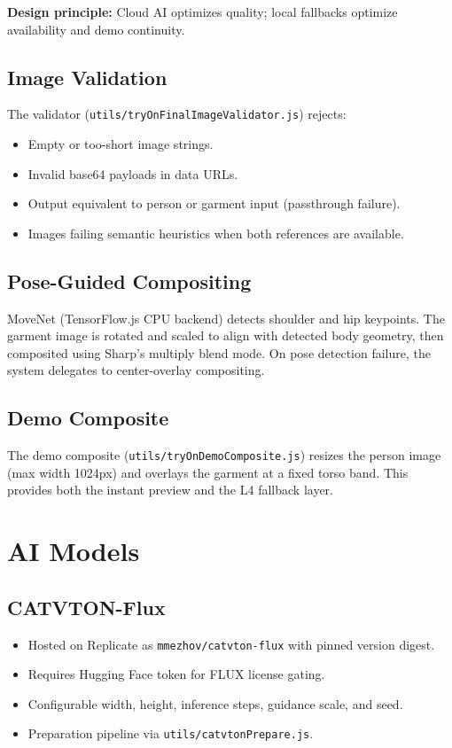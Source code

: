 \textbf{Design principle:} Cloud AI optimizes quality; local fallbacks optimize availability and demo continuity.

\subsection{Image Validation}

The validator (\texttt{utils/tryOnFinalImageValidator.js}) rejects:
\begin{itemize}[leftmargin=*]
  \item Empty or too-short image strings.
  \item Invalid base64 payloads in data URLs.
  \item Output equivalent to person or garment input (passthrough failure).
  \item Images failing semantic heuristics when both references are available.
\end{itemize}

\subsection{Pose-Guided Compositing}

MoveNet (TensorFlow.js CPU backend) detects shoulder and hip keypoints. The garment image is rotated and scaled to align with detected body geometry, then composited using Sharp's multiply blend mode. On pose detection failure, the system delegates to center-overlay compositing.

\subsection{Demo Composite}

The demo composite (\texttt{utils/tryOnDemoComposite.js}) resizes the person image (max width 1024px) and overlays the garment at a fixed torso band. This provides both the instant preview and the L4 fallback layer.

\section{AI Models}
\label{sec:ai-models}

\subsection{CATVTON-Flux}

\begin{itemize}[leftmargin=*]
  \item Hosted on Replicate as \texttt{mmezhov/catvton-flux} with pinned version digest.
  \item Requires Hugging Face token for FLUX license gating.
  \item Configurable width, height, inference steps, guidance scale, and seed.
  \item Preparation pipeline via \texttt{utils/catvtonPrepare.js}.
\end{itemize}

